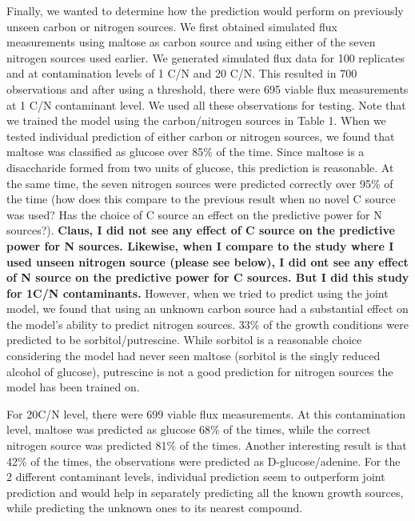 \documentclass[12pt]{article}
\begin{document}
Finally, we wanted to determine how the prediction would perform on previously unseen carbon or nitrogen sources. We first obtained simulated flux measurements using maltose as carbon source and using either of the seven nitrogen sources used earlier. We generated simulated flux data for 100 replicates and at contamination levels of 1 C/N and 20 C/N. This resulted in 700 observations and after using a threshold, there were 695 viable flux measurements at 1 C/N contaminant level. We used all these observations for testing. Note that we trained the model using the carbon/nitrogen sources in Table 1. When we tested individual prediction of either carbon or nitrogen sources, we found that maltose was classified as glucose over 85\% of the time. Since maltose is a disaccharide formed from two units of glucose, this prediction is reasonable. At the same time, the seven nitrogen sources were predicted correctly over 95\% of the time ({\color{red}how does this compare to the previous result when no novel C source was used? Has the choice of C source an effect on the predictive power for N sources?}). \textbf{Claus, I did not see any effect of C source on the predictive power for N sources. Likewise, when I compare to the study where I used unseen nitrogen source (please see below), I did ont see any effect of N source on the predictive power for C sources. But I did this study for 1C/N contaminants.} However, when we tried to predict using the joint model, we found that using an unknown carbon source had a substantial effect on the model's ability to predict nitrogen sources. 33\% of the growth conditions were predicted to be sorbitol/putrescine. While sorbitol is a reasonable choice considering the model had never seen maltose (sorbitol is the singly reduced alcohol of glucose), putrescine is not a good prediction for nitrogen sources the model has been trained on.

For 20C/N level, there were 699 viable flux measurements. At this contamination level, maltose was predicted as glucose 68\% of the times, while the correct nitrogen source was predicted 81\% of the times. Another interesting result is that 42\% of the times, the observations were predicted as D-glucose/adenine. For the 2 different contaminant levels, individual prediction seem to outperform joint prediction and would help in separately predicting all the known growth sources, while predicting the unknown ones to its nearest compound.
\end{document}
